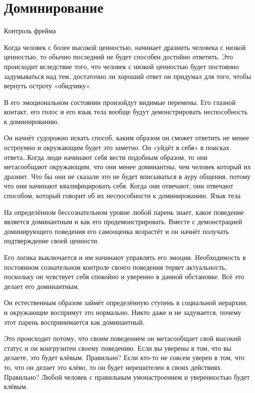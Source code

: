 \chapter{Доминирование}

Контроль фрейма

Когда человек с более высокой ценностью, начинает дразнить человека с низкой ценностью, то обычно последний не будет способен достойно ответить. Это происходит вследствие того, что человек с низкой ценностью будет постоянно задумываться над тем, достаточно ли хороший ответ он придумал для того, чтобы вернуть остроту «обидчику».

В его эмоциональном состоянии произойдут видимые перемены. Его глазной контакт, его голос и его язык тела вообще будут демонстрировать неспособность к доминированию.

Он начнёт судорожно искать способ, каким образом он сможет ответить не менее остроумно и окружающим будет это заметно. Он «уйдёт в себя» в поисках ответа\ldots Когда люди начинают себя вести подобным образом, то они метасообщают окружающим, что они менее доминантны, чем человек который их дразнит. Что бы они не сказали это не будет вписываться в ауру общения, потому что они начинают квалифицировать себя. Когда они отвечают, они отвечают способом, который говорит об их неспособности к доминированию.
Язык тела

На определённом бессознательном уровне любой парень знает, какое поведение является доминантным и как его продемонстрировать. Вместе с демонстрацией доминирующего поведения его самооценка возрастёт и он начнёт получать подтверждение своей ценности.

Его логика выключается и им начинают управлять его эмоции. Необходимость в постоянном сознательном контроле своего поведения теряет актуальность, поскольку он чувствует себя спокойно и уверенно в данной обстановке. Всё это делает его доминантным.

Он естественным образом займёт определённую ступень в социальной иерархии, и окружающие воспримут это нормально. Никто даже и не задумается, почему этот парень воспринимается как доминантный.

Это происходит потому, что своим поведением он метасообщает свой высокий статус и он конгруэнтен своему поведению. Если вы уверены в том, что вы делаете, это будет клёвым. Правильно? Если кто-то не совсем уверен в том, что то, что он делает это клёво, то он будет нерешителен в своих действиях. Правильно? Любой человек с правильным умонастроением и уверенностью будет клёвым.

